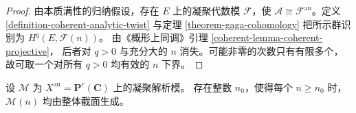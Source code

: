 \begin{proof}
由本质满性的归纳假设，存在 $E$ 上的凝聚代数模 $\mathcal F$，使
$\mathcal A\cong\mathcal F^{\mathrm{an}}$。定义
\ref{definition-coherent-analytic-twist} 与定理
\ref{theorem-gaga-cohomology} 把所示群识别为 $H^q(E,\mathcal F(n))$。
由《概形上同调》引理 \ref{coherent-lemma-coherent-projective}，
后者对 $q>0$ 与充分大的 $n$ 消失。可能非零的次数只有有限多个，
故可取一个对所有 $q>0$ 均有效的 $n$ 下界。
\end{proof}

\begin{lemma}
\label{lemma-projective-analytic-global-generation}
设 $\mathcal M$ 为 $X^{\mathrm{an}}=\mathbf P^r(\mathbf C)$ 上的凝聚解析模。
存在整数 $n_0$，使得每个 $n\geq n_0$ 时，$\mathcal M(n)$ 均由整体截面生成。
\end{lemma}

